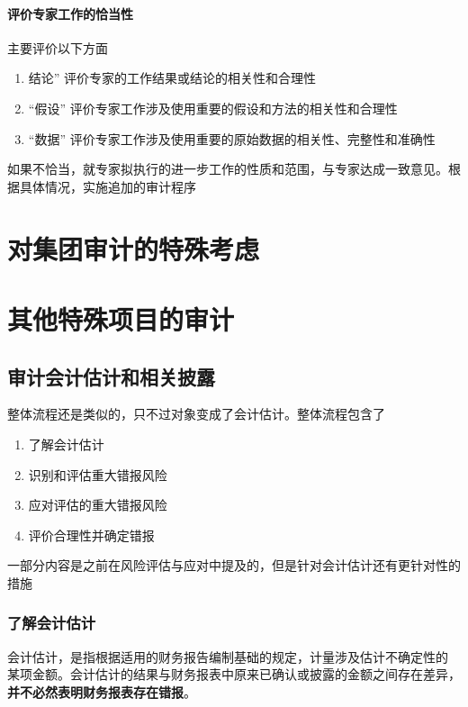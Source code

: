 \documentclass[UTF8,12pt]{ctexart}
\numberwithin{equation}{section} %
\numberwithin{figure}{section}
\numberwithin{table}{section}
\begin{document}
	\paragraph{评价专家工作的恰当性}
	主要评价以下方面
	\begin{enumerate}
		\item 结论” 评价专家的工作结果或结论的相关性和合理性
		
		\item “假设” 评价专家工作涉及使用重要的假设和方法的相关性和合理性
		
		\item “数据” 评价专家工作涉及使用重要的原始数据的相关性、完整性和准确性
	\end{enumerate}
	
	如果不恰当，就专家拟执行的进一步工作的性质和范围，与专家达成一致意见。根据具体情况，实施追加的审计程序
	
	\newpage
	\section{对集团审计的特殊考虑}
	
	\newpage
	\section{其他特殊项目的审计}
	
	\subsection{审计会计估计和相关披露}
	整体流程还是类似的，只不过对象变成了会计估计。整体流程包含了
	\begin{enumerate}
		\item 了解会计估计
		
		\item 识别和评估重大错报风险
		
		\item 应对评估的重大错报风险
		
		\item 评价合理性并确定错报
	\end{enumerate}
	一部分内容是之前在风险评估与应对中提及的，但是针对会计估计还有更针对性的措施
	
	\subsubsection{了解会计估计}
	会计估计，是指根据适用的财务报告编制基础的规定，计量涉及估计不确定性的 某项金额。会计估计的结果与财务报表中原来已确认或披露的金额之间存在差异，\textbf{并不必然表明财务报表存在错报}。
	
\end{document}

